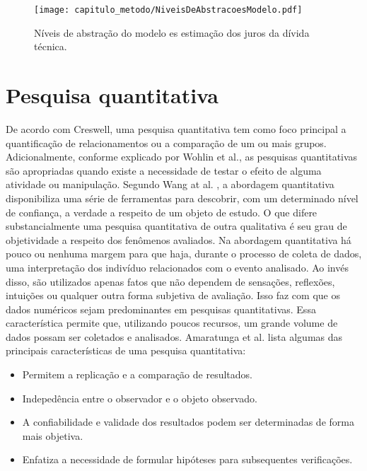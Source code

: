   \begin{figure}[H]
  \centering
  \texttt{[image: capitulo\_metodo/NiveisDeAbstracoesModelo.pdf]} 
  \caption{Níveis de abstração do modelo es estimação dos juros da dívida técnica. }
  \label{fig:cap_metodo_niveis_abstracao} 
\end{figure}




\section{Pesquisa quantitativa}




De acordo com Creswell\cite{w2016research}, uma pesquisa quantitativa tem como foco principal a quantificação de relacionamentos ou a comparação de um ou mais grupos. Adicionalmente, conforme explicado por Wohlin et al.\cite{wohlin2003empirical}, as pesquisas quantitativas são apropriadas quando existe a necessidade de testar o efeito de alguma atividade ou manipulação. Segundo Wang at al. \cite{wang201331}, a abordagem quantitativa disponibiliza uma série de ferramentas para descobrir, com um determinado nível de confiança, a verdade a respeito de um objeto de estudo. O que difere substancialmente uma pesquisa quantitativa de outra qualitativa é seu grau de  objetividade a respeito dos fenômenos avaliados. Na abordagem quantitativa há pouco ou nenhuma margem para que haja, durante o processo de coleta de dados, uma interpretação dos indivíduo relacionados com o evento analisado. Ao invés disso, são utilizados apenas fatos que não dependem de sensações, reflexões, intuições ou qualquer outra forma subjetiva de avaliação. Isso faz com que os dados numéricos sejam predominantes em pesquisas quantitativas.  Essa característica permite que, utilizando poucos recursos, um grande volume de dados possam ser coletados e analisados.  Amaratunga et al. \cite{amaratunga2002quantitative} lista algumas das principais características de uma pesquisa quantitativa:

\begin{itemize}
\item Permitem a replicação e a comparação de resultados.
\item Indepedência entre o observador e o objeto observado.
\item A confiabilidade e validade dos resultados podem ser determinadas de forma mais objetiva.
\item Enfatiza a necessidade de formular hipóteses para subsequentes verificações.
\end{itemize}

